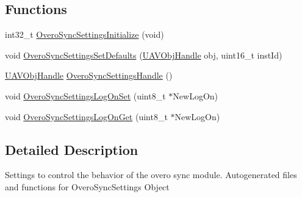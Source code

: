 \subsection*{\-Functions}
\begin{DoxyCompactItemize}
\item 
int32\-\_\-t \hyperlink{group___overo_sync_settings_gabaf303d57275d8df46495b7df58e29c9}{\-Overo\-Sync\-Settings\-Initialize} (void)
\item 
void \hyperlink{group___overo_sync_settings_gaab42644d1b504834c8501db1b7557827}{\-Overo\-Sync\-Settings\-Set\-Defaults} (\hyperlink{targets_2_u_a_v_objects_2inc_2uavobjectmanager_8h_a279053e22be53ce9f895043aaeb91e3b}{\-U\-A\-V\-Obj\-Handle} obj, uint16\-\_\-t inst\-Id)
\item 
\hyperlink{targets_2_u_a_v_objects_2inc_2uavobjectmanager_8h_a279053e22be53ce9f895043aaeb91e3b}{\-U\-A\-V\-Obj\-Handle} \hyperlink{group___overo_sync_settings_ga10fe791ac30b1db3d5a836a61aedb115}{\-Overo\-Sync\-Settings\-Handle} ()
\item 
void \hyperlink{group___overo_sync_settings_gab8dc40e6a657c2284f17acff836cd99f}{\-Overo\-Sync\-Settings\-Log\-On\-Set} (uint8\-\_\-t $\ast$\-New\-Log\-On)
\item 
void \hyperlink{group___overo_sync_settings_ga2fa67eb47374dae7f8aedce9c2af8349}{\-Overo\-Sync\-Settings\-Log\-On\-Get} (uint8\-\_\-t $\ast$\-New\-Log\-On)
\end{DoxyCompactItemize}


\subsection{\-Detailed \-Description}
\-Settings to control the behavior of the overo sync module. \-Autogenerated files and functions for \-Overo\-Sync\-Settings \-Object 

